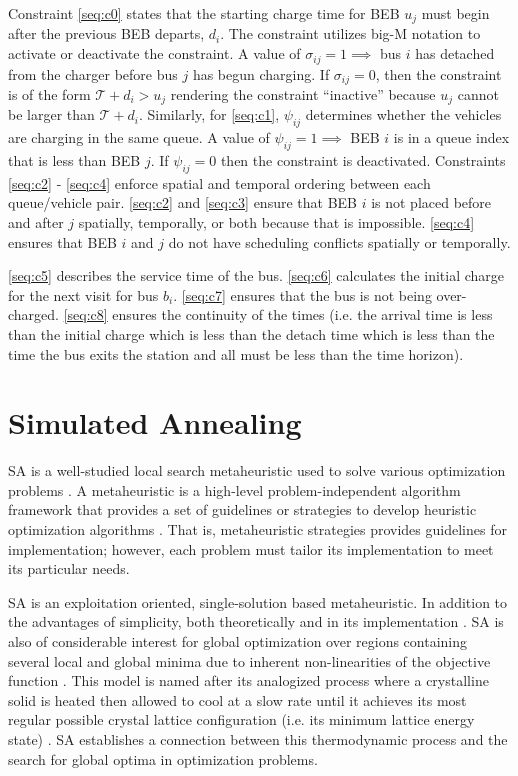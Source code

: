 \documentclass[ee,thesis]{usuthesis}
\newcommand{\T}{\mathcal{T}}                %
\begin{document}
Constraint \ref{seq:c0} states that the starting charge time for BEB \(u_j\) must begin after the previous BEB departs,
\(d_i\). The constraint utilizes big-M notation to activate or deactivate the constraint. A value of \(\sigma_{ij} = 1 \implies\)
bus \(i\) has detached from the charger before bus \(j\) has begun charging. If \(\sigma_{ij} = 0\), then the constraint is of the
form \(\T + d_i > u_j\) rendering the constraint ``inactive'' because \(u_j\) cannot be larger than \(\T + d_i\). Similarly, for
\ref{seq:c1}, \(\psi_{ij}\) determines whether the vehicles are charging in the same queue. A value of \(\psi_{ij} = 1 \implies\)
BEB \(i\) is in a queue index that is less than BEB \(j\). If \(\psi_{ij} = 0\) then the constraint is deactivated. Constraints
\ref{seq:c2} - \ref{seq:c4} enforce spatial and temporal ordering between each queue/vehicle pair. \ref{seq:c2} and
\ref{seq:c3} ensure that BEB \(i\) is not placed before and after \(j\) spatially, temporally, or both because that is
impossible. \ref{seq:c4} ensures that BEB \(i\) and \(j\) do not have scheduling conflicts spatially or temporally.

 \ref{seq:c5} describes the service time of the bus. \ref{seq:c6} calculates the initial charge for the next visit for
bus \(b_i\). \ref{seq:c7} ensures that the bus is not being over-charged. \ref{seq:c8} ensures the continuity of the times
(i.e. the arrival time is less than the initial charge which is less than the detach time which is less than the time
the bus exits the station and all must be less than the time horizon).

\section{Simulated Annealing}
\label{sec:simulated-annealing}
SA is a well-studied local search metaheuristic used to solve various optimization problems
\cite{gendreau-2018-handb-metah,press-1992-numer-recip}. A metaheuristic is a high-level problem-independent algorithm
framework that provides a set of guidelines or strategies to develop heuristic optimization algorithms
\cite{radosavljevic-2018-metah-optim}. That is, metaheuristic strategies provides guidelines for implementation;
however, each problem must tailor its implementation to meet its particular needs.

SA is an exploitation oriented, single-solution based metaheuristic. In addition to the advantages of simplicity, both
theoretically and in its implementation \cite{gendreau-2018-handb-metah,radosavljevic-2018-metah-optim}. SA is also of
considerable interest for global optimization over regions containing several local and global minima due to inherent
non-linearities of the objective function \cite{gendreau-2018-handb-metah}. This model is named after its analogized
process where a crystalline solid is heated then allowed to cool at a slow rate until it achieves its most regular
possible crystal lattice configuration (i.e. its minimum lattice energy state)
\cite{henderson-1989-theor-pract,press-1992-numer-recip}. SA establishes a connection between this thermodynamic
process and the search for global optima in optimization problems.
\end{document}

